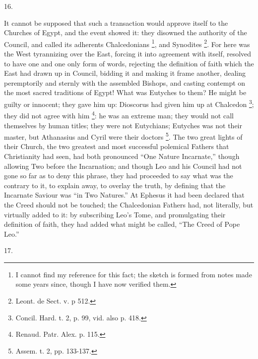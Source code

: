 16.

It cannot be supposed that such a transaction would approve itself
to the Churches of Egypt, and the event showed it: they disowned the
authority of the Council, and called its adherents Chalcedonians \footnote{I cannot find my reference for this fact;
the sketch is formed from notes made some years since, though I have
now verified them.}, and Synodites \footnote{Leont. de Sect. v. p 512.}.
For here was the West tyrannizing over the East, forcing it into
agreement with itself, resolved to have one and one only form of
words, rejecting the definition of faith which the East had drawn up
in Council, bidding it and making it frame another, dealing
peremptorily and sternly with the assembled Bishops, and casting
contempt on the most sacred traditions of Egypt! What was Eutyches to
them? He might be guilty or innocent; they gave him up: Dioscorus had
given him up at Chalcedon \footnote{Concil. Hard. t. 2, p. 99, vid. also p.
418.};
they did not agree with him \footnote{Renaud. Patr. Alex. p. 115.}:
he was an extreme man; they would not call themselves by human titles;
they were not Eutychians; Eutyches was not their master, but
Athanasius and Cyril were their doctors \footnote{Assem. t. 2, pp. 133-137.}. The two great lights of their Church, the two greatest and
most successful polemical Fathers that Christianity had seen, had both
pronounced ``One Nature Incarnate,'' though allowing Two
before the Incarnation; and though Leo and his Council had not gone so
far as to deny this phrase, they had proceeded to say what was the
contrary to it, to explain away, to overlay the truth, by defining
that the Incarnate Saviour was ``in Two Natures.'' At Ephesus
it had been declared that the Creed should not be touched; the
Chalcedonian Fathers had, not literally, but virtually added to it: by
subscribing Leo's Tome, and promulgating their definition of faith,
they had added what might be called, ``The Creed of Pope
Leo.''

17.

